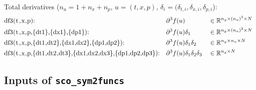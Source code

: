 \documentclass[11pt]{scrartcl}
\newcommand{\blist}[1]{\mbox{\lstinline!#1!}}
\newcommand{\R}{\mathbb{R}}
\begin{document}
Total derivatives ($n_u=1+n_x+n_p$, $u=(t,x,p)$, $\delta_i=(\delta_{t,i},\delta_{x,i},\delta_{p,i}$):
\begin{align*}
  &\mbox{\blist{df3(t,x,p)}:}&&\partial^3f(u)&&\in\R^{n_y\times (n_u)^3\times N}\\
  &\mbox{\blist{df3(t,x,p,\{dt1\},\{dx1\},\{dp1\})}:}&&\partial^3f(u)\delta_1&&\in\R^{n_y\times (n_u)^2\times N}\\
  &\mbox{\blist{df3(t,x,p,\{dt1,dt2\},\{dx1,dx2\},\{dp1,dp2\})}:}&&\partial^3f(u)\delta_1\delta_2&&\in\R^{n_y\times n_u\times N}\\
  &\mbox{\blist{df3(t,x,p,\{dt1,dt2,dt3\},\{dx1,dx2,dx3\},\{dp1,dp2,dp3\})}:}&&\partial^3f(u)\delta_1\delta_2\delta_3&&\in\R^{n_y\times N}
\end{align*}

\subsection{Inputs of \blist{sco_sym2funcs}}
\end{document}
